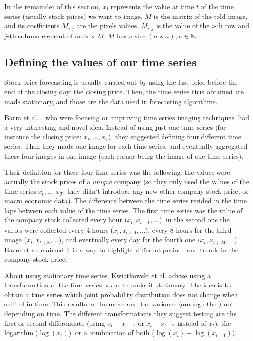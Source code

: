 \documentclass[11pt]{article}
\begin{document}
\begin{onehalfspace}
In the remainder of this section, $x_t$ represents the value at time $t$ of the time series (usually stock prices) we want to image. $M$ is the matrix of the told image, and its coefficients $M_{i,j}$ are the pixels values. $M_{i,j}$ is the value of the $i$-th row and $j$-th column element of matrix $M$. $M$ has a size $(n \times n), n \in \mathbb{N}$.

\subsection{Defining the values of our time series}
\label{sec:LR_preprocess}

Stock price forecasting is usually carried out by using the last price before the end of the closing day: the closing price. Then, the time series thus obtained are made stationary, and those are the data used in forecasting algorithms.

Barra et al. \cite{barra}, who were focusing on improving time series imaging techniques, had a very interesting and novel idea. Instead of using just one time series (for instance the closing price: $x_t,...,x_T$), they suggested defining four different time series. Then they made one image for each time series, and eventually aggregated these four images in one image (each corner being the image of one time series). 

Their definition for these four time series was the following: the values were actually the stock prices of a \emph{unique} company (so they only used the values of the time series $x_t,...,x_T$: they didn't introduce any new other company stock price, or macro economic data). The difference between the time series resided in the time laps between each value of the time series. The first time series was the value of the company stock collected every hour ($x_t, x_{t+1}, ...$), in the second one the values were collected every 4 hours ($x_t, x_{t + 4},...$), every 8 hours for the third image ($x_t, x_{t + 8}, ...$), and eventually every day for the fourth one ($x_t, x_{t + 24}, ...$). Barra et al. claimed it is a way to highlight different periods and trends in the company stock price. 

About using stationary time series, Kwiatkowski et al. \cite{stationary} advise using a transformation of the time series, so as to make it stationary. The idea is to obtain a time series which joint probability distribution does not change when shifted in time. This results in the mean and the variance (among other) not depending on time. The different transformations they suggest testing are the first or second differentiate (using $x_t - x_{t-1}$ or $x_t - x_{t-2}$ instead of $x_t$), the logarithm ($\log(x_t)$), or a combination of both ($\log(x_t) - \log(x_{t-1})$). 


\end{onehalfspace}
\end{document}
